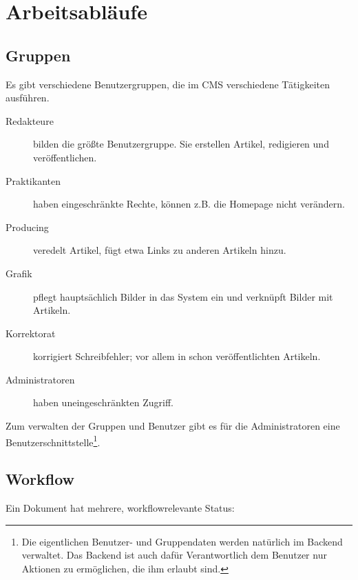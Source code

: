 %

\chapter{Arbeitsabläufe} \label{arbeitsablaeufe}

\section{Gruppen}

Es gibt verschiedene Benutzergruppen, die im CMS verschiedene Tätigkeiten
ausführen.

\begin{description}

  \item[Redakteure] bilden die größte Benutzergruppe. Sie erstellen
  Artikel, redigieren und veröffentlichen.

  \item[Praktikanten] haben eingeschränkte Rechte, können z.B. die Homepage
  nicht verändern.

  \item[Producing] veredelt Artikel, fügt etwa Links zu anderen Artikeln
    hinzu.

  \item[Grafik] pflegt hauptsächlich Bilder in das System ein und verknüpft
    Bilder mit Artikeln.

  \item[Korrektorat] korrigiert Schreibfehler; vor allem in schon
    veröffentlichten Artikeln.

  \item[Administratoren] haben uneingeschränkten Zugriff.

\end{description}

Zum verwalten der Gruppen und Benutzer gibt es für die Administratoren eine
Benutzerschnittstelle\footnote{Die eigentlichen Benutzer- und Gruppendaten
werden natürlich im Backend verwaltet. Das Backend ist auch dafür
Verantwortlich dem Benutzer nur Aktionen zu ermöglichen, die ihm erlaubt
sind.}.



\section{Workflow}

Ein Dokument hat mehrere, workflowrelevante Status:

